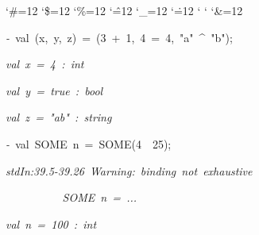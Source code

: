 \begin{list}{}
{\setlength{\leftmargin}{\leftmargini}
\setlength{\rightmargin}{0cm}
\setlength{\itemindent}{0cm}
\setlength{\listparindent}{0cm}
\setlength{\itemsep}{0cm}
\setlength{\parsep}{0cm}
\setlength{\labelsep}{0cm}
\setlength{\labelwidth}{0cm}
\catcode`\#=12
\catcode`\$=12
\catcode`\%=12
\catcode`\^=12
\catcode`\_=12
\catcode`\.=12
\catcode`
\catcode`
\catcode`\&=12
\ttfamily}
\small
\item[]\textsl{-\ }val\ (x,\ y,\ z)\ =\ (3\ +\ 1,\ 4\ =\ 4,\ "a"\ ^\ "b");
\item[]\textsl{val\ x\ =\ 4\ :\ int}
\item[]\textsl{val\ y\ =\ true\ :\ bool}
\item[]\textsl{val\ z\ =\ "ab"\ :\ string}
\item[]\textsl{-\ }val\ SOME\ n\ =\ SOME(4\ \ 25);
\item[]\textsl{stdIn:39.5-39.26\ Warning:\ binding\ not\ exhaustive}
\item[]\textsl{\ \ \ \ \ \ \ \ \ \ SOME\ n\ =\ ...}
\item[]\textsl{val\ n\ =\ 100\ :\ int}
\end{list}
